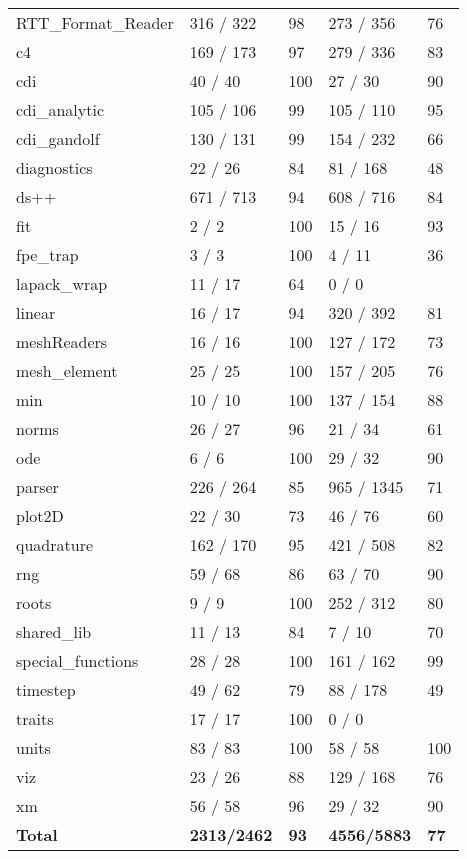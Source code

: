 \begin{table}
\begin{center}
\begin{tabular}{lllll}
RTT\_Format\_Reader &   316 /   322 &  98 &    273 /   356 &  76 \\
c4                  &   169 /   173 &  97 &    279 /   336 &  83 \\
cdi                 &    40 /    40 & 100 &     27 /    30 &  90 \\
cdi\_analytic       &   105 /   106 &  99 &    105 /   110 &  95 \\
cdi\_gandolf        &   130 /   131 &  99 &    154 /   232 &  66 \\
diagnostics         &    22 /     26 &  84 &     81 /   168 &  48 \\
ds++                &   671 /    713 &  94 &    608 /   716 &  84 \\
fit                 &     2 /     2  & 100 &     15 /    16 &  93 \\
fpe\_trap  &              3 /     3  & 100 &      4 /    11 &  36 \\
lapack\_wrap   &         11 /    17  &  64 &      0 /     0 & \\
linear  &                16 /    17  &  94 &    320 /   392 &  81 \\
meshReaders  &           16 /    16  & 100 &    127 /   172 &  73 \\
mesh\_element  &         25 /    25  & 100 &    157 /   205 &  76 \\
min  &                   10 /    10  & 100 &    137 /   154 &  88 \\
norms  &                 26 /    27  &  96 &     21 /    34 &  61 \\
ode  &                    6 /     6  & 100 &     29 /    32 &  90 \\
parser  &               226 /   264  &  85 &    965 /  1345 &  71 \\
plot2D  &                22 /    30  &  73 &     46 /    76 &  60 \\
quadrature  &           162 /   170  &  95 &    421 /   508 &  82 \\
rng  &                   59 /    68  &  86 &     63 /    70 &  90 \\
roots  &                  9 /     9  & 100 &    252 /   312 &  80 \\
shared\_lib  &           11 /    13  &  84 &      7 /    10 &  70 \\
special\_functions  &    28 /    28  & 100 &    161 /   162 &  99 \\
timestep  &              49 /    62  &  79 &     88 /   178 &  49 \\
traits  &                17 /    17  & 100 &      0 /     0 & \\
units  &                 83 /    83  & 100 &     58 /    58 & 100 \\
viz  &                   23 /    26  &  88 &    129 /   168 &  76 \\
xm  &                    56 /    58  &  96 &     29 /    32 &  90 \\
      \hline
      {\bf Total} & {\bf 2313/2462} & {\bf 93} & {\bf 4556/5883} & {\bf 77} \\


\end{tabular}
\end{center}
\end{table}
